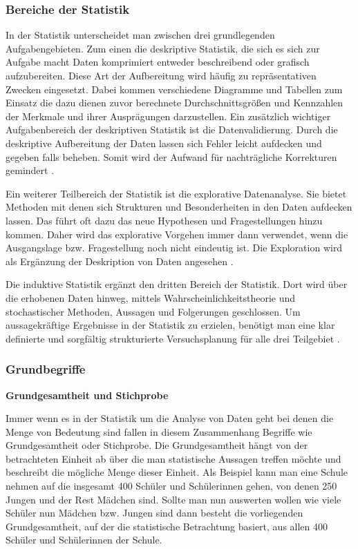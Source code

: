\subsubsection{Bereiche der Statistik}
In der Statistik unterscheidet man zwischen drei grundlegenden Aufgabengebieten. Zum einen die deskriptive Statistik, die sich es sich zur Aufgabe macht Daten komprimiert entweder beschreibend oder grafisch aufzubereiten. Diese Art der Aufbereitung wird häufig zu repräsentativen Zwecken eingesetzt. Dabei kommen verschiedene Diagramme und Tabellen zum Einsatz die dazu dienen zuvor berechnete Durchschnittsgrößen und Kennzahlen der Merkmale und ihrer Ausprägungen darzustellen. Ein zusätzlich wichtiger Aufgabenbereich der deskriptiven Statistik ist die Datenvalidierung. Durch die deskriptive Aufbereitung der Daten lassen sich Fehler leicht aufdecken und gegeben falls beheben. Somit wird der Aufwand für nachträgliche Korrekturen gemindert \citep[vgl.][10\psq]{fahrmeir2016}.

Ein weiterer Teilbereich der Statistik ist die explorative Datenanalyse. Sie bietet Methoden mit denen sich Strukturen und Besonderheiten in den Daten aufdecken lassen. Das führt oft dazu das neue Hypothesen und Fragestellungen hinzu kommen. Daher wird das explorative Vorgehen immer dann verwendet, wenn die Ausgangslage bzw. Fragestellung noch nicht eindeutig ist. Die Exploration wird als Ergänzung der Deskription von Daten angesehen \citep[vgl.][11\psq]{fahrmeir2016}.

Die induktive Statistik ergänzt den dritten Bereich der Statistik. Dort wird über die erhobenen Daten hinweg, mittels Wahrscheinlichkeitstheorie und stochastischer Methoden, Aussagen und Folgerungen geschlossen. Um aussagekräftige Ergebnisse in der Statistik zu erzielen, benötigt man eine klar definierte und sorgfältig strukturierte Versuchsplanung für alle drei Teilgebiet \citep[vgl.][12]{fahrmeir2016}.

\subsubsection{Grundbegriffe}
\textbf{Grundgesamtheit und Stichprobe}

Immer wenn es in der Statistik um die Analyse von Daten geht bei denen die Menge von Bedeutung sind fallen in diesem Zusammenhang Begriffe wie Grundgesamtheit oder Stichprobe. Die Grundgesamtheit hängt von der betrachteten Einheit ab über die man statistische Aussagen treffen möchte und beschreibt die mögliche Menge dieser Einheit. Als Beispiel kann man eine Schule nehmen auf die insgesamt 400 Schüler und Schülerinnen gehen, von denen 250 Jungen und der Rest Mädchen sind. Sollte man nun auswerten wollen wie viele Schüler nun Mädchen bzw. Jungen sind dann besteht die vorliegenden Grundgesamtheit, auf der die statistische Betrachtung basiert, aus allen 400 Schüler und Schülerinnen der Schule.

